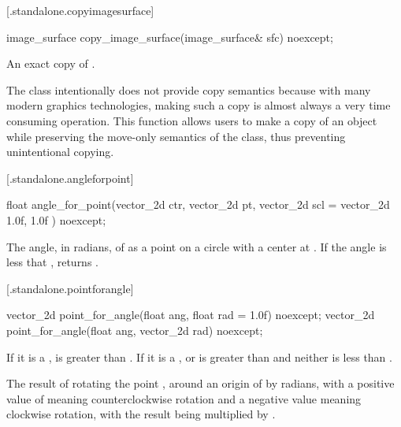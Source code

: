  [\iotwod.standalone.copyimagesurface] {}

%
\begin{itemdecl}
image_surface copy_image_surface(image_surface& sfc) noexcept;
\end{itemdecl}
\begin{itemdescr}
\pnum
\returns
An exact copy of .

\pnum
\begin{note}
The  class intentionally does not provide copy semantics because with many modern graphics technologies, making such a copy is almost always a very time consuming operation. This function allows users to make a copy of an  object while preserving the move-only semantics of the  class, thus preventing unintentional copying.
\end{note}
\end{itemdescr}

 [\iotwod.standalone.angleforpoint] {}

%
\begin{itemdecl}
float angle_for_point(vector_2d ctr, vector_2d pt,
  vector_2d scl = vector_2d{ 1.0f, 1.0f }) noexcept;
\end{itemdecl}
\begin{itemdescr}
\pnum
\returns
The angle, in radians, of  as a point on a circle with a center at . If the angle is less that , returns .
\end{itemdescr}

 [\iotwod.standalone.pointforangle] {}

%
\begin{itemdecl}
vector_2d point_for_angle(float ang, float rad = 1.0f) noexcept;
vector_2d point_for_angle(float ang, vector_2d rad) noexcept;
\end{itemdecl}
\begin{itemdescr}
\pnum
\requires
If it is a ,  is greater than . If it is a ,  or  is greater than  and neither is less than .

\pnum
\returns
The result of rotating the point , around an origin of  by  radians, with a positive value of  meaning counterclockwise rotation and a negative value meaning clockwise rotation, with the result being multiplied by .
\end{itemdescr}

